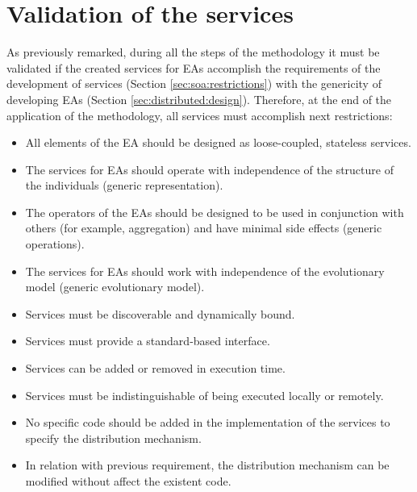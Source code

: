 \section{Validation of the services}
\label{sec:soaea:validationservices}

As previously remarked, during all the steps of the methodology it must be validated if the created services for EAs accomplish the requirements of the development of services (Section \ref{sec:soa:restrictions}) with the genericity of developing EAs (Section \ref{sec:distributed:design}). Therefore, at the end of the application of the methodology, all services must accomplish next restrictions:

\begin{itemize}
\item All elements of the EA should be designed as loose-coupled, stateless services.
\item The services for EAs should operate with independence of the structure of the individuals (generic representation).
\item The operators of the EAs should be designed to be used in conjunction with others (for example, aggregation) and have minimal side effects (generic operations).
\item The services for EAs should work with independence of the evolutionary model (generic evolutionary model).
\item Services must be discoverable and dynamically bound.
\item Services must provide a standard-based interface.
\item Services can be added or removed in execution time.
\item Services must be indistinguishable of being executed locally or remotely.
\item No specific code should be added in the implementation of the services to specify the distribution mechanism.
\item In relation with previous requirement, the distribution mechanism can be modified without affect the existent code.
\end{itemize}














